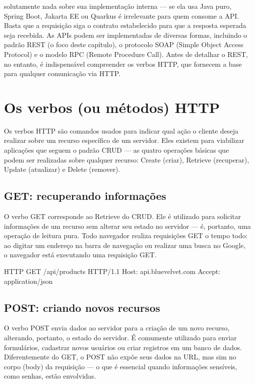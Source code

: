 solutamente nada sobre sua implementação interna — se ela usa Java puro, Spring Boot, Jakarta EE ou Quarkus é irrelevante para quem consome a API. Basta que a requisição siga o contrato estabelecido para que a resposta esperada seja recebida. As APIs podem ser implementadas de diversas formas, incluindo o padrão REST (o foco deste capítulo), o protocolo SOAP (Simple Object Access Protocol) e o modelo RPC (Remote Procedure Call). Antes de detalhar o REST, no entanto, é indispensável compreender os verbos HTTP, que fornecem a base para qualquer comunicação via HTTP.

\section{Os verbos (ou métodos) HTTP}

Os verbos HTTP são comandos usados para indicar qual ação o cliente deseja realizar sobre um recurso específico de um servidor. Eles existem para viabilizar aplicações que seguem o padrão CRUD — as quatro operações básicas que podem ser realizadas sobre qualquer recurso: Create (criar), Retrieve (recuperar), Update (atualizar) e Delete (remover).

\subsection{GET: recuperando informações}

O verbo GET corresponde ao Retrieve do CRUD. Ele é utilizado para solicitar informações de um recurso sem alterar seu estado no servidor — é, portanto, uma operação de leitura pura. Todo navegador realiza requisições GET o tempo todo: ao digitar um endereço na barra de navegação ou realizar uma busca no Google, o navegador está executando uma requisição GET.

\begin{infobox}{HTTP}
GET /api/products HTTP/1.1 Host: api.bluevelvet.com Accept: application/json
\end{infobox}

\subsection{POST: criando novos recursos}

O verbo POST envia dados ao servidor para a criação de um novo recurso, alterando, portanto, o estado do servidor. É comumente utilizado para enviar formulários, cadastrar novos usuários ou criar registros em um banco de dados. Diferentemente do GET, o POST não expõe seus dados na URL, mas sim no corpo (body) da requisição — o que é essencial quando informações sensíveis, como senhas, estão envolvidas.

